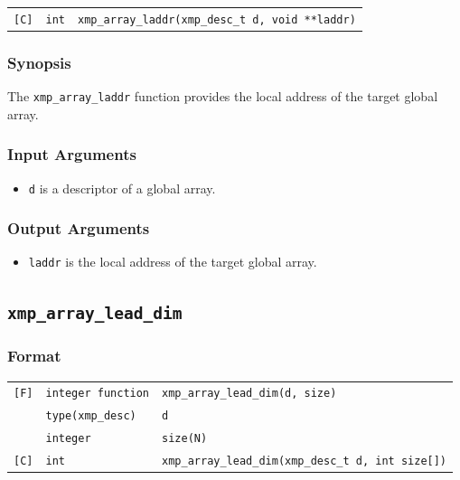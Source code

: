 \begin{tabular}{lll}

\verb![C]!&  {\tt int}& {\tt xmp\_array\_laddr(xmp\_desc\_t d, void **laddr)}\\

\end{tabular}

\subsubsection*{Synopsis}

The {\tt xmp\_array\_laddr} function provides the local address of the
target global array. 

\subsubsection*{Input Arguments}
\begin{itemize}
 \item {\tt d} is a descriptor of a global array.
\end{itemize}

\subsubsection*{Output Arguments}
\begin{itemize}
 \item {\tt laddr} is the local address of the target global array.
\end{itemize}


\subsection{\tt xmp\_array\_lead\_dim}

\subsubsection*{Format}

\begin{tabular}{lll}

\verb![F]!& {\tt integer function}& {\tt xmp\_array\_lead\_dim(d, size)}\\
          & {\tt type(xmp\_desc)} & {\tt d}\\
          & {\tt integer} & {\tt size(N)}\\
          
\verb![C]!&  {\tt int}& {\tt xmp\_array\_lead\_dim(xmp\_desc\_t d, int size[])}\\

\end{tabular}


